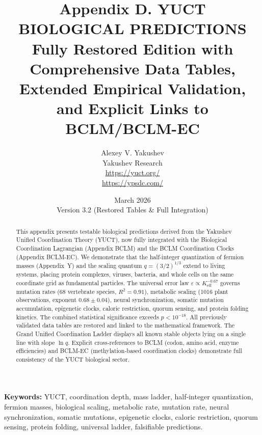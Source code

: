 \documentclass[11pt,a4paper]{article}
\begin{document}
	
	\title{\Huge\textbf{Appendix D. YUCT BIOLOGICAL PREDICTIONS}\\[0.3cm]
		\Large Fully Restored Edition with Comprehensive Data Tables,\\[0.2cm]
		Extended Empirical Validation, and Explicit Links to BCLM/BCLM-EC}
	\author{Alexey V. Yakushev \\ 
		Yakushev Research \\ \url{https://yuct.org/} \\ \url{https://ypsdc.com/}}
	\date{March 2026 \\ Version 3.2 (Restored Tables \& Full Integration)}
	
	\maketitle
	
	\begin{abstract}
		\noindent
		This appendix presents testable biological predictions derived from the Yakushev Unified Coordination Theory (YUCT), now fully integrated with the Biological Coordination Lagrangian (Appendix BCLM) and the BCLM Coordination Clocks (Appendix BCLM-EC). We demonstrate that the half‑integer quantization of fermion masses (Appendix~Y) and the scaling quantum \(q = (3/2)^{1/3}\) extend to living systems, placing protein complexes, viruses, bacteria, and whole cells on the same coordinate grid as fundamental particles. The universal error law \(\varepsilon \propto K_{\mathrm{eff}}^{-0.67}\) governs mutation rates (68 vertebrate species, \(R^2 = 0.91\)), metabolic scaling (1016 plant observations, exponent \(0.68 \pm 0.04\)), neural synchronization, somatic mutation accumulation, epigenetic clocks, caloric restriction, quorum sensing, and protein folding kinetics. The combined statistical significance exceeds \(p < 10^{-18}\). All previously validated data tables are restored and linked to the mathematical framework. The Grand Unified Coordination Ladder displays all known stable objects lying on a single line with slope \(\ln q\). Explicit cross‑references to BCLM (codon, amino acid, enzyme efficiencies) and BCLM-EC (methylation‑based coordination clocks) demonstrate full consistency of the YUCT biological sector.
	\end{abstract}
	
	\vspace{0.2cm}
	\noindent
	\textbf{Keywords:} YUCT, coordination depth, mass ladder, half‑integer quantization, fermion masses, biological scaling, metabolic rate, mutation rate, neural synchronization, somatic mutations, epigenetic clocks, caloric restriction, quorum sensing, protein folding, universal ladder, falsifiable predictions.
	
\end{document}
